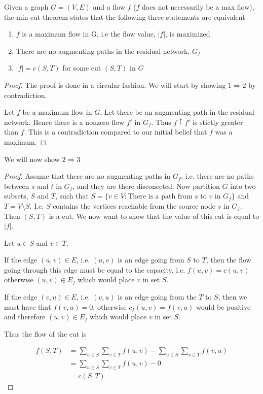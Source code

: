 \documentclass[10pt]{article}
\begin{document}
\begin{theorem}

  Given a graph $G = (V,E)$ and a flow $f$ ($f$ does not necessarily be a max flow), the min-cut theorem states that the following three statements are equivalent

  \begin{enumerate}
    \item $f$ is a maximum flow in G, i.e the flow value, $|f|$, is maximized
    \item There are no augmenting paths in the residual network, $G_f$
    \item $|f| = c(S,T)$ for some cut $(S,T)$ in $G$
  \end{enumerate}
  
\end{theorem}

\begin{proof}

The proof is done in a circular fashion. We will start by showing $1 \Rightarrow 2$ by contradiction.   
  
Let $f$ be a maximum flow in $G$. Let there be an augmenting path in the residual network. Hence there is a nonzero flow $f'$ in $G_f$. Thus $f \uparrow f'$ is stictly greater than $f$. This is a contradiction compared to our initial belief that $f$ was a maximum.
\end{proof} 

We will now show $2 \Rightarrow 3$
\begin{proof}
Assume that there are no augmenting paths in $G_f$, i.e. there are no paths between $s$ and $t$ in $G_f$, and they are there disconected. Now partition $G$ into two subsets, $S$ and $T$, such that $S = \{v \in V: \text{There is a path from $s$ to $v$ in $G_f$}\}$ and $T = V\setminus S$. I.e. $S$ contains the vertices reachable from the source node $s$ in $G_f$. Then $(S,T)$ is a cut. We now want to show that the value of this cut is equal to $|f|$. 

Let $u \in S$ and $v \in T$. 

If the edge $(u,v) \in E$, i.e. $(u,v)$ is an edge going from $S$ to $T$, then the flow going through this edge must be equal to the capacity, i.e. $f(u,v) = c(u,v)$ otherwise $(u,v) \in E_f$ which would place $v$ in set $S$. 

If the edge $(v,u) \in E$, i.e. $(v,u)$ is an edge going from the $T$ to $S$, then we must have that $f(v,u)=0$, otherwise $c_f(u,v) = f(v,u)$ would be positive and therefore $(u,v) \in E_f$ which would place $v$ in set $S$.

Thus the flow of the cut is

\begin{align*}
 f(S,T) &= \sum_{u \in S} \sum_{v \in T} f(u,v) - \sum_{u \in S} \sum_{v \in T} f(v,u) \\
        &= \sum_{u \in S} \sum_{v \in T} f(u,v) - 0 \\ 
        &= c(S,T) 
\end{align*}
\end{proof} 
\end{document}

